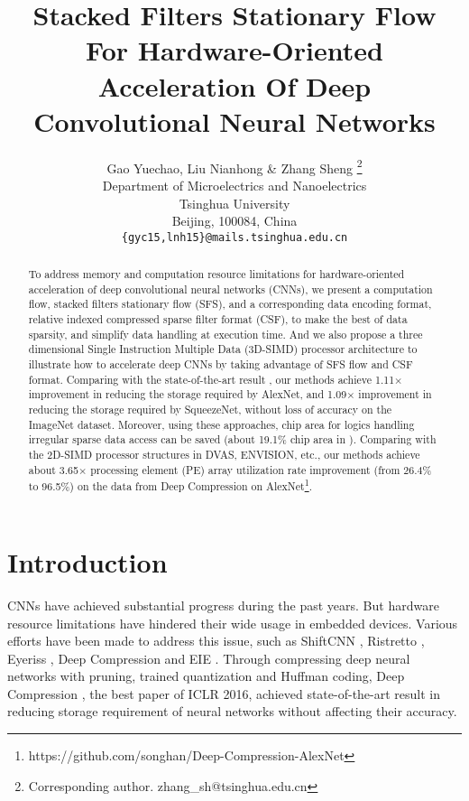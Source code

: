 \documentclass{article} %
\title{Stacked Filters Stationary Flow For Hardware-Oriented Acceleration Of Deep Convolutional Neural Networks}
\author{Gao Yuechao, Liu Nianhong \& Zhang Sheng \thanks{ Corresponding author. zhang\_sh@tsinghua.edu.cn } \\
Department of Microelectrics and Nanoelectrics\\
Tsinghua University\\
Beijing, 100084, China \\
\texttt{\{gyc15,lnh15\}@mails.tsinghua.edu.cn}
}
\begin{document}
\maketitle

\begin{abstract}
To address memory and computation resource limitations for hardware-oriented acceleration of deep convolutional neural networks (CNNs), we present a computation flow, stacked filters stationary flow (SFS), and a corresponding data encoding format, relative indexed compressed sparse filter format (CSF), to make the best of data sparsity, and simplify data handling at execution time. And we also propose a three dimensional Single Instruction Multiple Data (3D-SIMD) processor architecture to illustrate how to accelerate deep CNNs by taking advantage of SFS flow and CSF format. Comparing with the state-of-the-art result \citep{han2015deep_compression}, our methods achieve 1.11$\times$ improvement in reducing the storage required by AlexNet, and 1.09$\times$ improvement in reducing the storage required by SqueezeNet, without loss of accuracy on the ImageNet dataset. Moreover, using these approaches, chip area for logics handling irregular sparse data access can be saved (about 19.1\% chip area in \citep{han2016eie}). Comparing with the 2D-SIMD processor structures in DVAS, ENVISION, etc., our methods achieve about 3.65$\times$ processing element (PE) array utilization rate improvement (from 26.4\% to 96.5\%) on the data from Deep Compression on AlexNet\footnote{https://github.com/songhan/Deep-Compression-AlexNet}.
\end{abstract}

\section{Introduction}

CNNs have achieved substantial progress during the past years. But hardware resource limitations have hindered their wide usage in embedded devices. Various efforts have been made to address this issue, such as ShiftCNN \citep{Gudovskiy2017ShiftCNN}, Ristretto \citep{Gysel2016Ristretto}, Eyeriss \citep{Chen2017Eyeriss}, Deep Compression \citep{han2015deep_compression} and EIE \citep{han2016eie}. Through compressing deep neural networks with pruning, trained quantization and Huffman coding, Deep Compression \citep{han2015deep_compression}, the best paper of ICLR 2016, achieved state-of-the-art result in reducing storage requirement of neural networks without affecting their accuracy.
\end{document}
